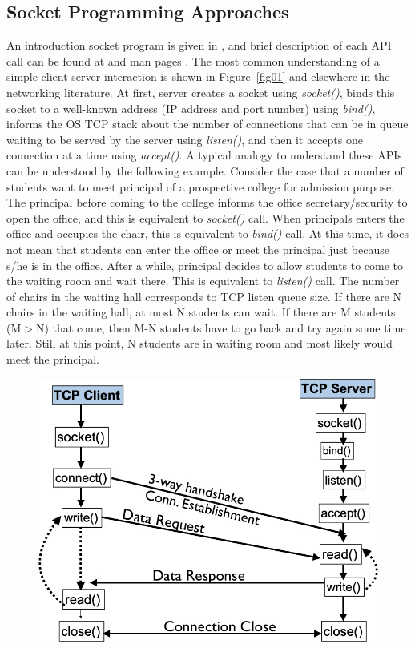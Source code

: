 \begin{multicols}{2}
\vspace{-.2cm}

\section{Socket Programming Approaches}

\vspace{-.2cm}

An introduction socket program is given in \cite{art1-key03} \cite{art1-key09}, and brief description of each API call can be found at \cite{art1-key08} and man pages \cite{art1-key10}.  The most common understanding of a simple client server interaction is shown in Figure~\ref{fig01} \cite{art1-key07} and elsewhere in the networking literature. At first, server creates a socket using \textit{socket()}, binds this socket to a well-known address (IP address and port number) using \textit{bind()}, informs the OS TCP stack about the number of connections that can be in queue waiting to be served by the server using \textit{listen()}, and then it accepts one connection at a time using \textit{accept()}. A typical analogy to understand these APIs can be understood by the following example. Consider the case that a number of students want to meet principal of a prospective college for admission purpose. The principal before coming to the college informs the office secretary/security to open the office, and this is equivalent to \textit{socket()} call. When principals enters the office and occupies the chair, this is equivalent to \textit{bind()} call. At this time, it does not mean that students can enter the office or meet the principal just because s/he is in the office. After a while, principal decides to allow students to come to the waiting room and wait there. This is equivalent to \textit{listen()} call. The number of chairs in the waiting hall corresponds to TCP listen queue size. If there are N chairs in the waiting hall, at most N students can wait. If there are M students (M$>$N) that come, then  M-N students have to go back and try again some time later. Still at this point, N students are in waiting room and most likely would meet the principal.
\begin{figure}[H]
\centering
\includegraphics[scale=1.2]{src/Figures/chap1/fig01.jpg}

\end{figure}
\end{multicols}
